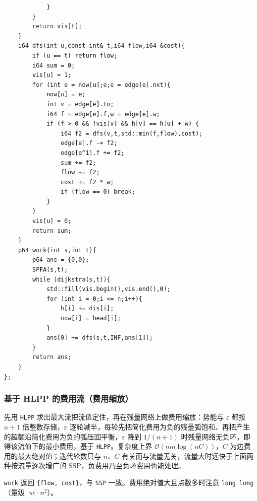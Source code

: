 \begin{lstlisting}
            }
        }
        return vis[t];
    }
    i64 dfs(int u,const int& t,i64 flow,i64 &cost){
        if (u == t) return flow;
        i64 sum = 0;
        vis[u] = 1;
        for (int e = now[u];e;e = edge[e].nxt){
            now[u] = e;
            int v = edge[e].to;
            i64 f = edge[e].f,w = edge[e].w;
            if (f > 0 && !vis[v] && h[v] == h[u] + w) {
                i64 f2 = dfs(v,t,std::min(f,flow),cost);
                edge[e].f -= f2;
                edge[e^1].f += f2;
                sum += f2;
                flow -= f2;
                cost += f2 * w;
                if (flow == 0) break;
            }
        }
        vis[u] = 0;
        return sum;
    }
    p64 work(int s,int t){
        p64 ans = {0,0};
        SPFA(s,t);
        while (dijkstra(s,t)){
            std::fill(vis.begin(),vis.end(),0);
            for (int i = 0;i <= n;i++){
                h[i] += dis[i];
                now[i] = head[i];
            }
            ans[0] += dfs(s,t,INF,ans[1]);
        }
        return ans;
    }
};
\end{lstlisting}

\subsubsection{基于 HLPP 的费用流（费用缩放）}

先用 \texttt{HLPP} 求出最大流把流值定住，再在残量网络上做费用缩放：势能与 $\varepsilon$ 都按 $n+1$ 倍整数存储，$\varepsilon$ 逐轮减半，每轮先把简化费用为负的残量弧饱和、再把产生的超额沿简化费用为负的弧压回平衡，$\varepsilon$ 降到 $1/(n+1)$ 时残量网络无负环，即得该流值下的最小费用，基于 \texttt{HLPP}。复杂度上界 $\mathcal{O}(nm\log (nC))$，$C$ 为边费用的最大绝对值；迭代轮数只与 $n$、$C$ 有关而与流量无关，流量大时远快于上面两种按流量逐次增广的 SSP，负费用乃至负环费用也能处理。

\texttt{work} 返回 \verb|{flow, cost}|，与 \texttt{SSP} 一致。费用绝对值大且点数多时注意 \texttt{long long}（量级 $|w|\cdot n^2$）。

